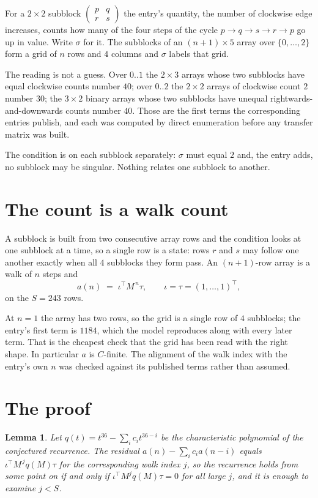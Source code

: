 \documentclass[11pt,a4paper]{article}
\theoremstyle{plain}
\newtheorem{lemma}[theorem]{Lemma}
\theoremstyle{definition}
\begin{document}
For a $2\times2$ subblock $\begin{pmatrix}p&q\\r&s\end{pmatrix}$ the
entry's quantity, the number of clockwise edge increases, counts how many of the four steps of the cycle $p\to q\to s\to r\to p$ go up in value. Write $\sigma$ for it. The subblocks of an
$(n+1)\times5$ array over $\{0,\dots,2\}$ form a grid of $n$ rows and $4$
columns and $\sigma$ labels that grid.

The reading is not a guess. Over $0..1$ the $2\times3$ arrays whose two subblocks have equal
clockwise counts number $40$; over $0..2$ the $2\times2$ arrays of clockwise count $2$ number
$30$; the $3\times2$ binary arrays whose two subblocks have unequal rightwards-and-downwards
counts number $40$. Those are the first terms the corresponding entries publish, and each was
computed by direct enumeration before any transfer matrix was built.

The condition is on each subblock separately: $\sigma$ must equal $2$ and, the entry adds, no subblock may be singular. Nothing
relates one subblock to another.

\section{The count is a walk count}

A subblock is built from two consecutive array rows and the condition looks
at one subblock at a time, so a single row is a state: rows $r$ and $s$ may follow one another
exactly when all $4$ subblocks they form pass. An $(n+1)$-row array is a walk of $n$ steps and
\[
a(n)\;=\;\iota^{\!\top}M^{\,n}\tau,\qquad\iota=\tau=(1,\dots,1)^{\!\top},
\]
on the $S=243$ rows.

At $n=1$ the array has two rows, so the grid is a single row of $4$
subblocks; the entry's first term is $1184$, which the model
reproduces along with every later term. That is the cheapest check that the grid has been read
with the right shape.
In particular $a$ is $C$-finite. The alignment of the walk index with the entry's own $n$ was
checked against its published terms rather than assumed.

\section{The proof}

\begin{lemma}\label{lem:crit}
Let $q(t)=t^{36}-\sum_i c_it^{36-i}$ be the characteristic polynomial of the
conjectured recurrence. The residual $a(n)-\sum_ic_ia(n-i)$ equals
$\iota^{\!\top}M^{\,j}q(M)\tau$ for the corresponding walk index $j$, so the recurrence
holds from some point on if and only if $\iota^{\!\top}M^{j}q(M)\tau=0$ for all large $j$,
and it is enough to examine $j<S$.
\end{lemma}
\end{document}
